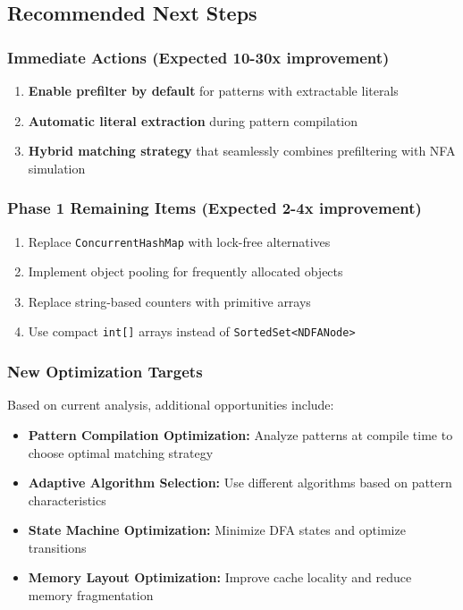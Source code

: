 \documentclass[11pt,a4paper]{article}
\begin{document}
\subsection{Recommended Next Steps}

\subsubsection{Immediate Actions (Expected 10-30x improvement)}

\begin{enumerate}
\item \textbf{Enable prefilter by default} for patterns with extractable literals
\item \textbf{Automatic literal extraction} during pattern compilation
\item \textbf{Hybrid matching strategy} that seamlessly combines prefiltering with NFA simulation
\end{enumerate}

\subsubsection{Phase 1 Remaining Items (Expected 2-4x improvement)}

\begin{enumerate}
\item Replace \texttt{ConcurrentHashMap} with lock-free alternatives
\item Implement object pooling for frequently allocated objects  
\item Replace string-based counters with primitive arrays
\item Use compact \texttt{int[]} arrays instead of \texttt{SortedSet<NDFANode>}
\end{enumerate}

\subsubsection{New Optimization Targets}

Based on current analysis, additional opportunities include:

\begin{itemize}
\item \textbf{Pattern Compilation Optimization:} Analyze patterns at compile time to choose optimal matching strategy
\item \textbf{Adaptive Algorithm Selection:} Use different algorithms based on pattern characteristics
\item \textbf{State Machine Optimization:} Minimize DFA states and optimize transitions
\item \textbf{Memory Layout Optimization:} Improve cache locality and reduce memory fragmentation
\end{itemize}
\end{document}
